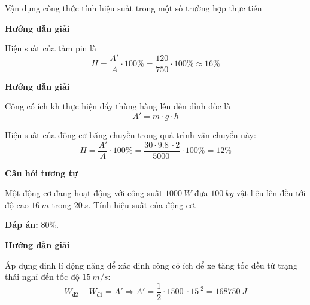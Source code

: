 \begin{dang}{Vận dụng công thức tính hiệu suất trong một số trường hợp thực tiễn}
	{	\begin{center}
			\textbf{Hướng dẫn giải}
		\end{center}
		
		Hiệu suất của tấm pin là
		$$H=\dfrac{A'}{A} \cdot 100\% = \dfrac{120}{750} \cdot 100\% \approx 16\%$$
		
		
		
	}
	
	
	
	{	\begin{center}
			\textbf{Hướng dẫn giải}
		\end{center}
		
		Công có ích kh thực hiện đẩy thùng hàng lên đến đỉnh dốc là
		$$A'=m\cdot g \cdot h$$
		
		Hiệu suất của động cơ băng chuyền trong quá trình vận chuyển này:
		$$H=\dfrac{A'}{A} \cdot 100\%  = \dfrac{30 \cdot \SI{9.8}{} \cdot 2}{\SI{5000}{}} \cdot 100\% = 12\%$$
		
		\begin{center}
			\textbf{Câu hỏi tương tự}
		\end{center}
		
		Một động cơ đang hoạt động với công suất $\SI{1000}{W}$ đưa $\SI{100}{kg}$ vật liệu lên đều tới độ cao $\SI{16}{m}$ trong $\SI{20}{s}$. Tính hiệu suất của động cơ.
		
		\textbf{Đáp án:} $80\%$.
	}
	
	{	\begin{center}
			\textbf{Hướng dẫn giải}
		\end{center}
		
		Áp dụng định lí động năng để xác định công có ích để xe tăng tốc đều từ trạng thái nghỉ đến tốc độ $\SI{15}{m/s}$:
		$$W_\text{đ2} - W_\text{đ1} = A' \Rightarrow A' = \dfrac{1}{2} \cdot \SI{1500}{} \cdot \SI{15}{}^2 = \SI{168750}{J}$$
		
}
\end{dang}

